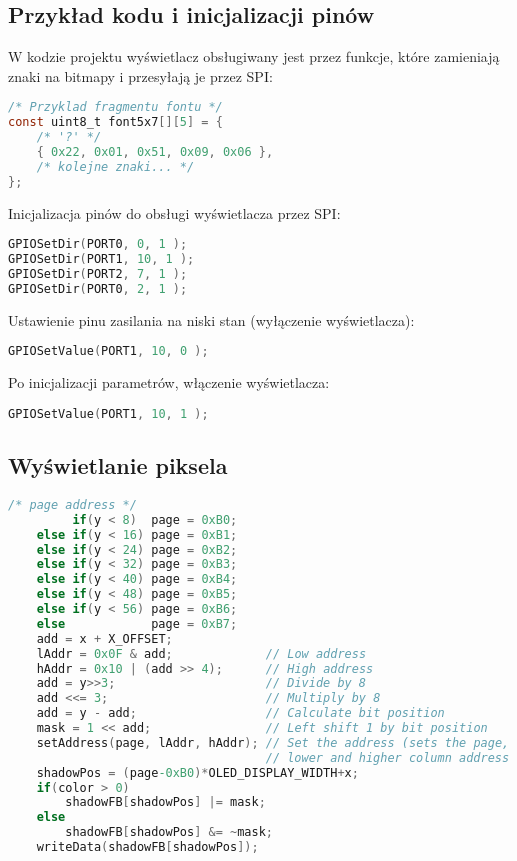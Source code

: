 \documentclass[a4paper,12pt]{report}
\begin{document}
\subsection{Przykład kodu i inicjalizacji pinów}

W kodzie projektu wyświetlacz obsługiwany jest przez funkcje, które zamieniają znaki na bitmapy i przesyłają je przez SPI:

\begin{lstlisting}[language=C]
/* Przyklad fragmentu fontu */
const uint8_t font5x7[][5] = {
    /* '?' */
    { 0x22, 0x01, 0x51, 0x09, 0x06 },
    /* kolejne znaki... */
};
\end{lstlisting}

Inicjalizacja pinów do obsługi wyświetlacza przez SPI:
\begin{lstlisting}[language=C]
GPIOSetDir(PORT0, 0, 1 );
GPIOSetDir(PORT1, 10, 1 );
GPIOSetDir(PORT2, 7, 1 );
GPIOSetDir(PORT0, 2, 1 );
\end{lstlisting}

Ustawienie pinu zasilania na niski stan (wyłączenie wyświetlacza):
\begin{lstlisting}[language=C]
GPIOSetValue(PORT1, 10, 0 );
\end{lstlisting}
Po inicjalizacji parametrów, włączenie wyświetlacza:
\begin{lstlisting}[language=C]
GPIOSetValue(PORT1, 10, 1 );
\end{lstlisting}

\subsection{Wyświetlanie piksela}
\begin{lstlisting}[language=C]
    /* page address */
         if(y < 8)  page = 0xB0;
    else if(y < 16) page = 0xB1;
    else if(y < 24) page = 0xB2;
    else if(y < 32) page = 0xB3;
    else if(y < 40) page = 0xB4;
    else if(y < 48) page = 0xB5;
    else if(y < 56) page = 0xB6;
    else            page = 0xB7;
    add = x + X_OFFSET;
    lAddr = 0x0F & add;             // Low address
    hAddr = 0x10 | (add >> 4);      // High address
    add = y>>3;                     // Divide by 8
    add <<= 3;                      // Multiply by 8
    add = y - add;                  // Calculate bit position
    mask = 1 << add;                // Left shift 1 by bit position
    setAddress(page, lAddr, hAddr); // Set the address (sets the page,
                                    // lower and higher column address pointers)
    shadowPos = (page-0xB0)*OLED_DISPLAY_WIDTH+x;
    if(color > 0)
        shadowFB[shadowPos] |= mask;
    else
        shadowFB[shadowPos] &= ~mask;
    writeData(shadowFB[shadowPos]);
\end{lstlisting}
\end{document}
